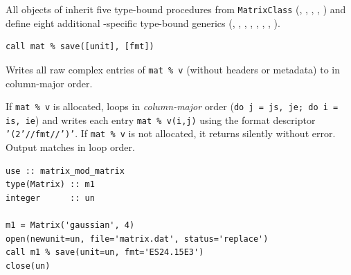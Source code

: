 All objects of  inherit five type-bound procedures from \texttt{MatrixClass} (, , , , ) and define eight additional -specific type-bound generics (, , , , , , , ).


\lstset{language=[95]Fortran}
\begin{lstlisting}
call mat % save([unit], [fmt])
\end{lstlisting}

Writes all raw complex entries of \texttt{mat \% v} (without headers or metadata) to  in column-major order.

If \texttt{mat \% v} is allocated,  loops in \emph{column-major} order (\texttt{do j = js, je; do i = is, ie}) and writes each  entry \texttt{mat \% v(i,j)} using the format descriptor \texttt{'(2'//fmt//')'}. If \texttt{mat \% v} is not allocated, it returns silently without error. Output matches  in loop order.

\begin{description}[leftmargin=2.2cm, style=nextline]
\end{description}

\lstset{language=[95]Fortran}
\begin{lstlisting}
use :: matrix_mod_matrix
type(Matrix) :: m1
integer      :: un

m1 = Matrix('gaussian', 4)
open(newunit=un, file='matrix.dat', status='replace')
call m1 % save(unit=un, fmt='ES24.15E3')
close(un)
\end{lstlisting}

